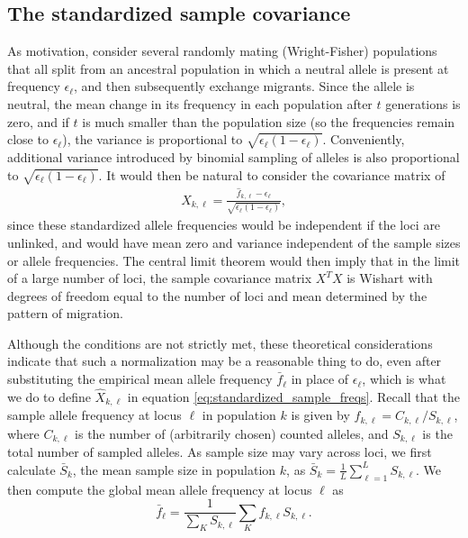 \documentclass[10pt,letterpaper]{article}
\begin{document}
\subsection*{The standardized sample covariance}
\label{ss:cov_methods}

As motivation, consider several randomly mating (Wright-Fisher) populations
that all split from an ancestral population
in which a neutral allele is present at frequency $\epsilon_\ell$,
and then subsequently exchange migrants.
Since the allele is neutral, the mean change in its frequency in each population after $t$ generations is zero,
and if $t$ is much smaller than the population size (so the frequencies remain close to $\epsilon_\ell$), 
the variance is proportional to $\sqrt{\epsilon_\ell (1-\epsilon_\ell)}$.
Conveniently, additional variance introduced by binomial sampling of alleles
is also proportional to $\sqrt{\epsilon_\ell (1-\epsilon_\ell)}$.
It would then be natural to consider the covariance matrix of 
\begin{align}
  X_{k,\ell} = \frac{ \hat f_{k,\ell} - \epsilon_\ell }{ \sqrt{ \epsilon_\ell (1- \epsilon_\ell) } } ,
\end{align}
since these standardized allele frequencies would be independent if the loci are unlinked,
and would have mean zero and variance independent of the sample sizes or allele frequencies.
The central limit theorem would then imply that in the limit of a large number of loci, 
the sample covariance matrix $X^T X$ is Wishart with degrees of freedom equal to the number of loci
and mean determined by the pattern of migration.

Although the conditions are not strictly met, 
these theoretical considerations indicate that such a normalization may be a reasonable thing to do,
even after substituting the empirical mean allele frequency $\bar f_\ell$ in place of $\epsilon_\ell$,
which is what we do to define $\hat X_{k,\ell}$ in equation \eqref{eq:standardized_sample_freqs}.
Recall that the sample allele frequency at locus $\ell$ in population $k$ is given by $\hat{f}_{k,\ell} = C_{k,\ell}/S_{k,\ell}$,  
where $C_{k,\ell}$ is the number of (arbitrarily chosen) counted alleles,
and $S_{k,\ell}$ is the total number of sampled alleles.
As sample size may vary across loci, we first calculate $\bar{S}_k$, 
the mean sample size in population $k$, 
as $\bar{S}_k = \frac{1}{L}\sum_{\ell=1}^L S_{k,\ell}$.  
We then compute the global mean allele frequency at locus $\ell$ as
\begin{equation}
\label{eq:sample_mean_freq}
\bar{f}_{\ell} = \frac{1}{\sum_K S_{k,\ell}} \sum_K \hat{f}_{k,\ell} S_{k,\ell} .
\end{equation}
\end{document}
